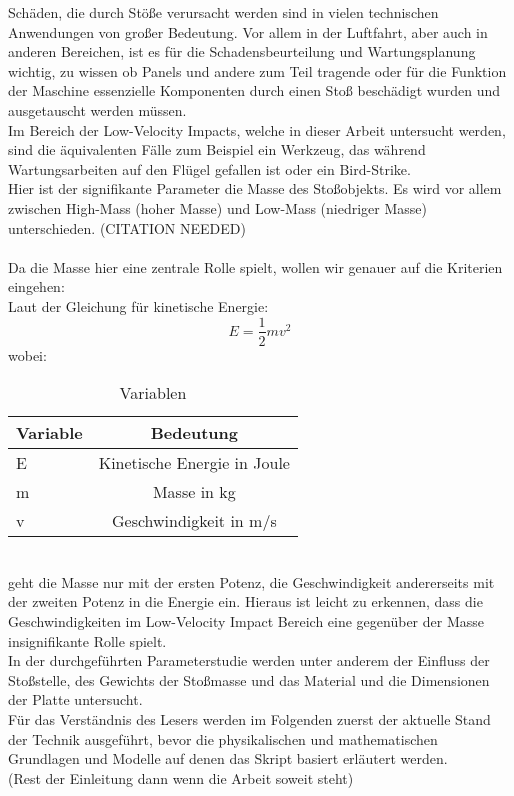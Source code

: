 Schäden, die durch Stöße verursacht werden sind in vielen technischen
Anwendungen von großer Bedeutung. Vor allem in der Luftfahrt, aber auch in
anderen Bereichen, ist es für die Schadensbeurteilung und Wartungsplanung
wichtig, zu wissen ob Panels und andere zum Teil tragende oder für die Funktion
der Maschine essenzielle Komponenten durch einen Stoß beschädigt wurden und
ausgetauscht werden müssen. \\
Im Bereich der Low-Velocity Impacts, welche in dieser Arbeit untersucht werden,
sind die äquivalenten Fälle zum Beispiel ein Werkzeug, das während
Wartungsarbeiten auf den Flügel gefallen ist oder ein Bird-Strike. \\
Hier ist der signifikante Parameter die Masse des Stoßobjekts. Es wird vor allem
zwischen High-Mass (hoher Masse) und Low-Mass (niedriger Masse) unterschieden.
(CITATION NEEDED)\\
\\
Da die Masse hier eine zentrale Rolle spielt, wollen wir genauer auf die
Kriterien eingehen: \\
Laut der Gleichung für kinetische Energie: 
\begin{equation}
E = \frac{1}{2}mv^2
\end{equation}
wobei: 
\begin{table}[h!]
	\begin{center}
		\caption{Variablen}
		\label{tab:Tabelle 1}
		\begin{tabular}{l|c}
			\textbf{Variable} & \textbf{Bedeutung}\\
			\hline
			E & Kinetische Energie in Joule\\
			m & Masse in kg\\
			v & Geschwindigkeit in m/s\\
		\end{tabular}
	\end{center}
\end{table}\\
geht die Masse nur mit der ersten Potenz, die Geschwindigkeit andererseits mit
der zweiten Potenz in die Energie ein. Hieraus ist leicht zu erkennen, dass die
Geschwindigkeiten im Low-Velocity Impact Bereich eine gegenüber der Masse
insignifikante Rolle spielt. \\
In der durchgeführten Parameterstudie werden unter anderem der Einfluss der
Stoßstelle, des Gewichts der Stoßmasse und das Material und die Dimensionen der
Platte untersucht. \\
Für das Verständnis des Lesers werden im Folgenden zuerst der aktuelle Stand der
Technik ausgeführt, bevor die physikalischen und mathematischen Grundlagen und
Modelle auf denen das Skript basiert erläutert werden.\\
(Rest der Einleitung dann wenn die Arbeit soweit steht)
\\
